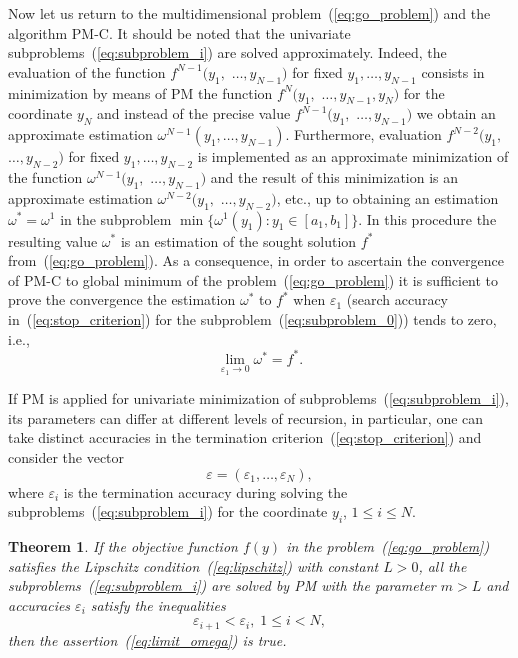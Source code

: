 \documentclass[preprint]{elsarticle}
\newtheorem{theorem}{Theorem}
\begin{document}
Now let us return to the multidimensional problem~(\ref{eq:go_problem}) and the algorithm PM-C. It should be noted that the univariate subproblems~(\ref{eq:subproblem_i}) are solved approximately. Indeed, the evaluation of the function $f^{N - 1}(y_1,$ $\dots, y_{N - 1})$ for fixed $y_1, \dots, y_{N - 1}$ consists in minimization by means of PM the function $f^N(y_1,$ $\dots, y_{N - 1}, y_N)$ for the coordinate $y_N$ and instead of the precise value $f^{N - 1}(y_1,$ $\dots, y_{N - 1})$ we obtain an approximate estimation $\omega^{N - 1}(y_1, \dots, y_{N - 1})$. Furthermore, evaluation $f^{N - 2}(y_1,$ $\dots, y_{N - 2})$ for fixed $y_1, \dots, y_{N - 2}$ is implemented as an approximate minimization of the function $\omega^{N - 1}(y_1,$ $\dots, y_{N - 1})$ and the result of this minimization is an approximate estimation $\omega^{N - 2}(y_1,$ $\dots, y_{N - 2})$, etc., up to obtaining an estimation $\omega^* = \omega^1$ in the subproblem $\min \{ \omega^1(y_1) : y_1 \in [a_1, b_1] \}$. In this procedure the resulting value $\omega^*$ is an estimation of the sought solution $f^*$ from~(\ref{eq:go_problem}). As a consequence, in order to ascertain the convergence of PM-C to global minimum of the problem~(\ref{eq:go_problem}) it is sufficient to prove the convergence the estimation $\omega^*$ to $f^*$ when $\varepsilon_1$ (search accuracy in~(\ref{eq:stop_criterion}) for the subproblem~(\ref{eq:subproblem_0})) tends to zero, i.e.,
\begin{equation}
  \label{eq:limit_omega}
  \lim_{\varepsilon_1 \rightarrow 0} \omega^* = f^*.
\end{equation}

If PM is applied for univariate minimization of subproblems~(\ref{eq:subproblem_i}), its parameters can differ at different levels of
recursion, in particular, one can take distinct accuracies in the termination criterion~(\ref{eq:stop_criterion}) and consider the vector
\begin{equation}
  \varepsilon = ( \varepsilon_1, \dots, \varepsilon_N ),
\end{equation}
%
where $\varepsilon_i$ is the termination accuracy during solving the subproblems~(\ref{eq:subproblem_i}) for the coordinate $y_i$, $1 \leq i \leq N$.

\begin{theorem}
  If the objective function $f(y)$ in the problem~(\ref{eq:go_problem}) satisfies the Lipschitz condition~(\ref{eq:lipschitz}) with constant $L > 0$, all the subproblems~(\ref{eq:subproblem_i}) are solved by PM with the parameter $m > L$ and accuracies $\varepsilon_i$ satisfy the inequalities
  \begin{equation}
    \label{eq:eps_next_lower_eps}
    \varepsilon_{i + 1} < \varepsilon_i, \; 1 \leq i < N,
  \end{equation}
  then the assertion~(\ref{eq:limit_omega}) is true.
\end{theorem}
\end{document}
